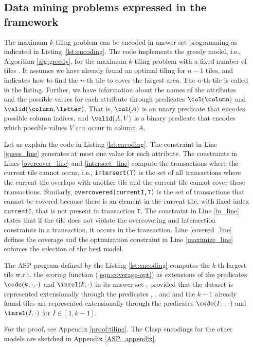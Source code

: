 \subsection{Data mining problems expressed in the framework} 

The maximum $k$-tiling problem can be encoded in answer set programming as indicated in Listing~\ref{lst:encoding}. The code implements the greedy model, i.e., Algorithm \ref{alg:greedy}, for the maximum $k$-tiling problem with a fixed number of tiles \parencite{tiling}. It assumes we have already found an optimal tiling for $n-1$ tiles, and indicates how to find the $n$-th tile to cover the largest area. The $n$-th tile is called \guess in the listing. \changesb Further, we have information about the names of the attributes and the possible values for each attribute through predicates $\col(\column)$ and $\valid(\column, \letter)$. That is, $\col(A)$ is an unary predicate that encodes possible column indices, and $\valid(A,V)$ is a binary predicate that encodes which possible values $V$ can occur in column $A$. \changese

Let us explain the code in Listing \ref{lst:encoding}. The constraint in Line \ref{guess_line} generates at most one value for each attribute. The constraints in Lines \ref{overcover_line} and \ref{intersect_line} compute the transactions where the current tile cannot occur, i.e., \texttt{intersect(T)} is the set of all transactions where the current tile overlaps with another tile and the current tile cannot cover these transactions. Similarly, \texttt{overcovered(currentI,T)} is the set of transactions that cannot be covered because there is an element in the current tile, with fixed index \texttt{currentI}, that is not present in transaction \texttt{T}. The constraint in Line \ref{in_line} states that if the tile does not violate the overcovering and intersection constraints in a transaction, it occurs in the transaction. Line \ref{covered_line} defines the coverage and the optimization constraint in Line \ref{maximize_line} enforces the selection of the best model.

\begin{theorem}\label{theorem:tiling}
 The ASP program \pprog defined by the Listing \ref{lst:encoding} computes the $k$-th largest tile w.r.t. the scoring function \maxcover (\ref{eqn:coverage-opt}) as extensions of the predicates $\code(k,\cdot,\cdot)$ and $\inrel(k,\cdot)$ in its answer set \as, provided that 
the dataset is represented extensionally through the predicates \db, \valid, and \col 
and the $k-1$ already found tiles are represented extensionally through the predicates $\code(I,\cdot,\cdot)$ and $\inrel(I,\cdot)$ for $I \in [1,k-1]$.
\end{theorem}
For the proof, see Appendix \ref{proof:tiling}.
The Clasp encodings for the other models are sketched in Appendix \ref{ASP_appendix}.


